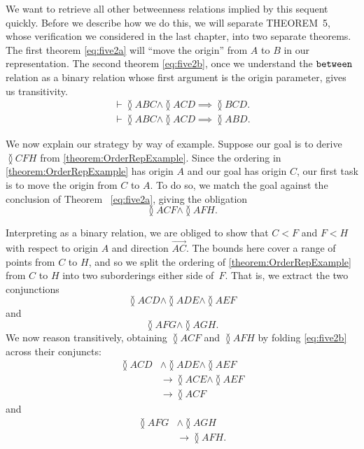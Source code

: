 We want to retrieve all other betweenness relations implied by this sequent quickly. Before we describe how we do this, we will separate THEOREM~5, whose verification we considered in the last chapter, into two separate theorems. The first theorem \eqref{eq:five2a} will ``move the origin'' from $A$ to $B$ in our representation. The second theorem \eqref{eq:five2b}, once we understand the $\texttt{between}$ relation as a binary relation whose first argument is the origin parameter, gives us transitivity.
\begin{gather}
\label{eq:five2a}\vdash \between{A}{B}{C} \wedge \between{A}{C}{D} \implies \between{B}{C}{D}.\\
\label{eq:five2b}\vdash \between{A}{B}{C} \wedge \between{A}{C}{D} \implies \between{A}{B}{D}.
\end{gather}

We now explain our strategy by way of example. Suppose our goal is to derive $\between{C}{F}{H}$ from \eqref{theorem:OrderRepExample}. Since the ordering in \eqref{theorem:OrderRepExample} has origin $A$ and our goal has origin $C$, our first task is to move the origin from $C$ to $A$. To do so, we match the goal against the conclusion of Theorem~ \ref{eq:five2a}, giving the obligation
\begin{displaymath}
\between{A}{C}{F} \wedge \between{A}{F}{H}.
\end{displaymath}

Interpreting  as a binary relation, we are obliged to show that $C < F$ and $F < H$ with respect to origin $A$ and direction $\overrightarrow{AC}$. The bounds here cover a range of points from $C$ to $H$, and so we split the ordering of \eqref{theorem:OrderRepExample} from $C$ to $H$ into two suborderings either side of~$F$. That is, we extract the two conjunctions
\begin{displaymath}
\between{A}{C}{D} \wedge \between{A}{D}{E} \wedge\between{A}{E}{F}
\end{displaymath}
and
\begin{displaymath}
\between{A}{F}{G}\wedge\between{A}{G}{H}.
\end{displaymath}
We now reason transitively, obtaining $\between{A}{C}{F}$ and $\between{A}{F}{H}$ by folding \eqref{eq:five2b} across their conjuncts:
\begin{align*}
\between{A}{C}{D} &\wedge \between{A}{D}{E} \wedge\between{A}{E}{F}\\
&\longrightarrow \between{A}{C}{E} \wedge \between{A}{E}{F}\\
&\longrightarrow \between{A}{C}{F}
\end{align*}
and
\begin{align*}
\between{A}{F}{G} &\wedge \between{A}{G}{H}\\
&\longrightarrow \between{A}{F}{H}.
\end{align*}

